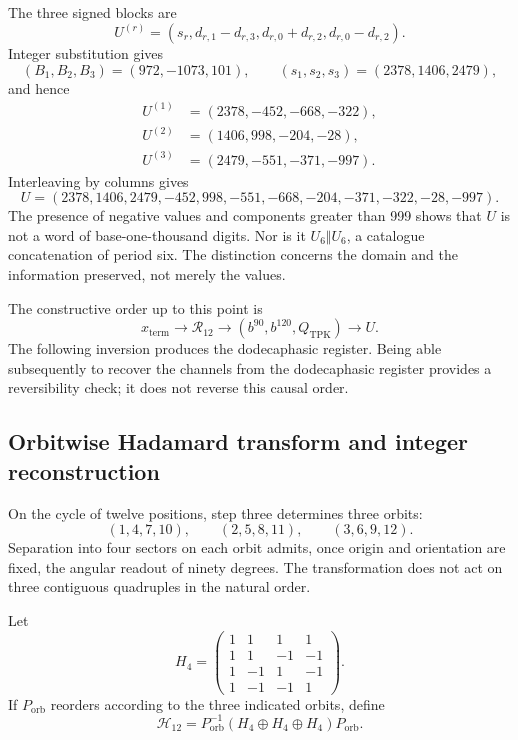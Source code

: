 The three signed blocks are
\begin{equation}
 U^{(r)}=(s_r,d_{r,1}-d_{r,3},d_{r,0}+d_{r,2},d_{r,0}-d_{r,2}).
 \label{eq:k-bloques-firmados}
\end{equation}
Integer substitution gives
\[
 (B_1,B_2,B_3)=(972,-1073,101),\qquad
 (s_1,s_2,s_3)=(2378,1406,2479),
\]
and hence
\begin{align*}
 U^{(1)}&=(2378,-452,-668,-322),\\
 U^{(2)}&=(1406,998,-204,-28),\\
 U^{(3)}&=(2479,-551,-371,-997).
\end{align*}
Interleaving by columns gives
\begin{equation}
 U=(2378,1406,2479,-452,998,-551,
       -668,-204,-371,-322,-28,-997).
 \label{eq:k-u-firmado}
\end{equation}
The presence of negative values and components greater than 999
shows that \(U\) is not a word of base-one-thousand digits. Nor is it
\(U_6\Vert U_6\), a catalogue concatenation of period six. The distinction
concerns the domain and the information preserved, not merely the values.

The constructive order up to this point is
\[
 x_{\mathrm{term}}\longrightarrow\mathcal R_{12}
 \longrightarrow(b^{90},b^{120},Q_{\mathrm{TPK}})
 \longrightarrow U.
\]
The following inversion produces the dodecaphasic register. Being able subsequently to recover
the channels from the dodecaphasic register provides a reversibility check; it does not
reverse this causal order.

\subsection{Orbitwise Hadamard transform and integer reconstruction}
\label{subsec:k-hadamard}

On the cycle of twelve positions, step three determines three orbits:
\[
 (1,4,7,10),\qquad(2,5,8,11),\qquad(3,6,9,12).
\]
Separation into four sectors on each orbit admits, once origin and
orientation are fixed, the angular readout of ninety degrees. The
transformation does not act on three contiguous quadruples in the natural order.

Let
\[
 H_4=\begin{pmatrix}
 1&1&1&1\\1&1&-1&-1\\1&-1&1&-1\\1&-1&-1&1
 \end{pmatrix}.
\]
If \(P_{\mathrm{orb}}\) reorders according to the three indicated orbits,
define
\[
 \mathcal H_{12}=P_{\mathrm{orb}}^{-1}
 (H_4\oplus H_4\oplus H_4)P_{\mathrm{orb}}.
\]

